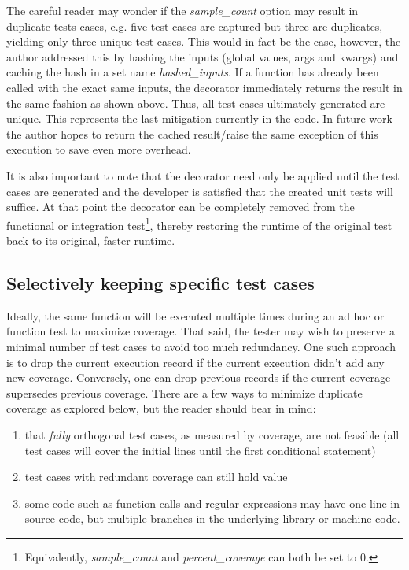 The careful reader may wonder if the \textit{sample\_count} option may result in 
duplicate tests cases, e.g. five test cases are captured but three are duplicates, 
yielding only three unique test cases.  This would in fact be the case, however, the author 
addressed this by hashing the inputs (global values, args and kwargs) and 
caching the hash in a set name \textit{hashed\_inputs}.  If a function has
already been called with the exact same inputs, the decorator immediately returns
the result in the same fashion as shown above. Thus, all test cases 
ultimately generated are unique.  This represents the last mitigation
currently in the code.  In future work the author hopes to return the cached 
result/raise the same exception of this execution to save even more overhead.  

It is also important to note that the decorator need only be applied until the 
test cases are generated and the developer is satisfied that the created unit
tests will suffice.  At that point the decorator can be completely removed
from the functional or integration test\footnote{Equivalently, 
\textit{sample\_count} and \textit{percent\_coverage} can both be set to 0.}, 
thereby restoring the runtime of
the original test back to its original, faster runtime.  

\subsection{Selectively keeping specific test cases}\label{sec:tuning-1}
Ideally, the same function will be executed multiple times during an ad hoc or 
function test to maximize coverage.  That said, the tester may wish to preserve 
a minimal number of test cases to avoid too much redundancy.  
%
One such approach is to drop the current execution
record if the current execution didn’t add any new coverage.  
Conversely, one can drop previous records if the current coverage supersedes
previous coverage.
There are a few ways to minimize duplicate coverage as explored below, 
but the reader should bear in mind:

\begin{enumerate}
  \item that \textit{fully} orthogonal test cases, as measured by coverage, are not feasible 
  (all test cases will cover the initial lines until the first conditional statement) 
  \item test cases with redundant coverage can still hold value
  \item some code such as function calls and regular expressions may have one 
  line in source code, but multiple branches in the underlying library or machine code.
\end{enumerate}


